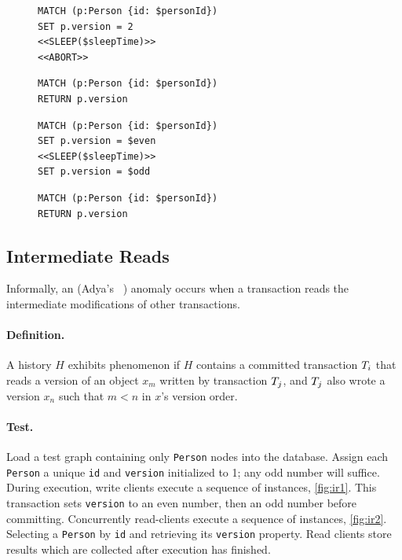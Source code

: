 \begin{figure}[htb]
\centering
\begin{minipage}{0.45\linewidth}
\begin{lstlisting}[language=cypher,label=fig:ar1,caption=\tx{Aborted Read (G1a) $T_\mathrm{W}$}.]
MATCH (p:Person {id: $personId})
SET p.version = 2
<<SLEEP($sleepTime)>>
<<ABORT>>
\end{lstlisting}

\begin{lstlisting}[language=cypher,label=fig:ar2,caption=\tx{Aborted Read (G1a) $T_\mathrm{R}$}.]
MATCH (p:Person {id: $personId})
RETURN p.version
\end{lstlisting}
\end{minipage}
%
\quad
%
\begin{minipage}{0.45\linewidth}
\begin{lstlisting}[language=cypher,label=fig:ir1,caption=\tx{Interm. Read (G1b) $T_\mathrm{W}$}.]
MATCH (p:Person {id: $personId})
SET p.version = $even
<<SLEEP($sleepTime)>>
SET p.version = $odd
\end{lstlisting}

\begin{lstlisting}[language=cypher,label=fig:ir2,caption=\tx{Interm. Read (G1b) $T_\mathrm{R}$}.]
MATCH (p:Person {id: $personId})
RETURN p.version
\end{lstlisting}
\end{minipage}
\end{figure}

\subsection*{Intermediate Reads}

Informally, an  (Adya's ~\cite{adya1999weak}) anomaly occurs when a transaction reads the intermediate modifications of other transactions.

\paragraph{Definition.}
A history $H$ exhibits phenomenon  if $H$ contains a committed transaction $T_i$ that reads a version of an object $x_m$ written by transaction $T_j$, and $T_j$ also wrote a version $x_n$ such that $m < n$ in $x$'s version order.

\paragraph{Test.}
Load a test graph containing only \texttt{Person} nodes into the database. Assign each \texttt{Person} a unique \texttt{id} and \texttt{version} initialized to 1; any odd number will suffice.
During execution, write clients execute a sequence of  instances, \autoref{fig:ir1}.
This transaction sets \texttt{version} to an even number, then an odd number before committing.
Concurrently read-clients execute a sequence of  instances, \autoref{fig:ir2}.
Selecting a \texttt{Person} by \texttt{id} and retrieving its \texttt{version} property.
Read clients store results which are collected after execution has finished.

